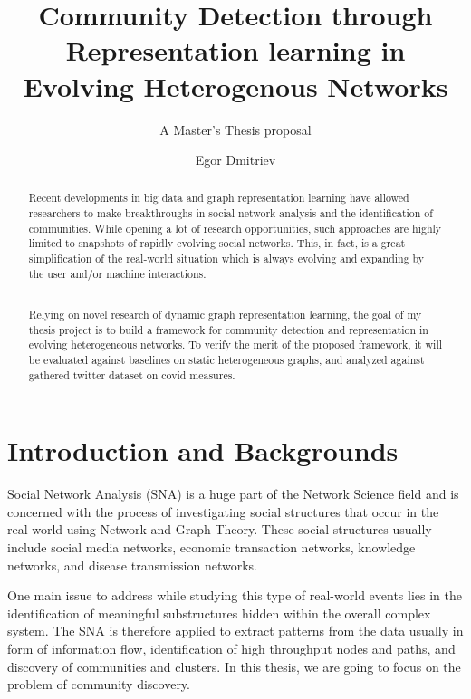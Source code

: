 \documentclass[
acmsmall,
nonacm,
screen,
acmthm]{../../scripts/pandoc/templates/acmart}
\title{Community Detection through Representation learning in Evolving
Heterogenous Networks}
\subtitle{A Master's Thesis proposal}
\author{Egor Dmitriev}
\affiliation{%
  \institution{Utrecht University}
  \country{The Netherlands}
}
\date{}
\begin{document}
\begin{abstract}
Recent developments in big data and graph representation learning have
allowed researchers to make breakthroughs in social network analysis and
the identification of communities. While opening a lot of research
opportunities, such approaches are highly limited to snapshots of
rapidly evolving social networks. This, in fact, is a great
simplification of the real-world situation which is always evolving and
expanding by the user and/or machine interactions.\\
\strut \\
Relying on novel research of dynamic graph representation learning, the
goal of my thesis project is to build a framework for community
detection and representation in evolving heterogeneous networks. To
verify the merit of the proposed framework, it will be evaluated against
baselines on static heterogeneous graphs, and analyzed against gathered
twitter dataset on covid measures.
\end{abstract}
\maketitle



{
\setcounter{tocdepth}{2}
\tableofcontents
\pagebreak
}





\hypertarget{introduction-and-backgrounds}{%
\section{Introduction and
Backgrounds}\label{introduction-and-backgrounds}}

Social Network Analysis (SNA) is a huge part of the Network Science
field and is concerned with the process of investigating social
structures that occur in the real-world using Network and Graph Theory.
These social structures usually include social media networks, economic
transaction networks, knowledge networks, and disease transmission
networks.

One main issue to address while studying this type of real-world events
lies in the identification of meaningful substructures hidden within the
overall complex system. The SNA is therefore applied to extract patterns
from the data usually in form of information flow, identification of
high throughput nodes and paths, and discovery of communities and
clusters. In this thesis, we are going to focus on the problem of
community discovery.
\end{document}
